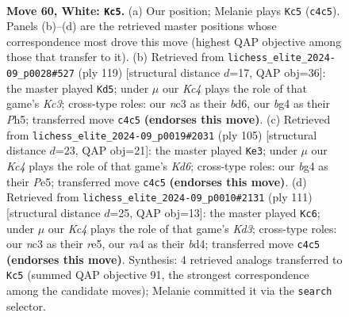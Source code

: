\documentclass[11pt]{article}
\begin{document}
\clearpage

\begin{figure}[p]\centering
\begin{subfigure}{0.46\textwidth}\centering
\resizebox{\linewidth}{!}{%
\newchessgame
\chessboard[
  setfen={8/7p/4k3/4p3/rpK3b1/2n5/6r1/8 w - - 10 60},
  showmover=false,
  pgfstyle=straightmove, color=movearrow, markmove={c4-c5}
]}
\caption{}
\end{subfigure}\hfill
\begin{subfigure}{0.46\textwidth}\centering
\resizebox{\linewidth}{!}{%
\newchessgame
\chessboard[
  setfen={3K4/2P5/2kB1RP1/7p/7P/8/8/1r6 b - - 4 60},
  showmover=false,
  pgfstyle=straightmove, color=movearrow, markmove={c6-d5}
]}
\caption{}
\end{subfigure}
\\[4pt]
\begin{subfigure}{0.46\textwidth}\centering
\resizebox{\linewidth}{!}{%
\newchessgame
\chessboard[
  setfen={8/8/8/4p1P1/4N3/K2k1P2/5R2/6r1 b - - 4 53},
  showmover=false,
  pgfstyle=straightmove, color=movearrow, markmove={d3-e3}
]}
\caption{}
\end{subfigure}\hfill
\begin{subfigure}{0.46\textwidth}\centering
\resizebox{\linewidth}{!}{%
\newchessgame
\chessboard[
  setfen={8/8/3k4/4RP2/3BK3/2P5/6PP/8 b - - 0 56},
  showmover=false,
  pgfstyle=straightmove, color=movearrow, markmove={d6-c6}
]}
\caption{}
\end{subfigure}
\caption{\textbf{Move 60, White: \texttt{Kc5}.} (a) Our position; Melanie plays \texttt{Kc5} (\texttt{c4c5}). Panels (b)--(d) are the retrieved master positions whose correspondence most drove this move (highest QAP objective among those that transfer to it). (b) Retrieved from \texttt{lichess\_elite\_2024-09\_p0028\#527} (ply 119) [structural distance $d$=17, QAP obj=36]: the master played \texttt{Kd5}; under $\mu$ our \emph{Kc4} plays the role of that game's \emph{Kc3}; cross-type roles: our \emph{n}c3 as their \emph{b}d6, our \emph{b}g4 as their \emph{P}h5; transferred move \texttt{c4c5} \textbf{(endorses this move)}. (c) Retrieved from \texttt{lichess\_elite\_2024-09\_p0019\#2031} (ply 105) [structural distance $d$=23, QAP obj=21]: the master played \texttt{Ke3}; under $\mu$ our \emph{Kc4} plays the role of that game's \emph{Kd6}; cross-type roles: our \emph{b}g4 as their \emph{P}e5; transferred move \texttt{c4c5} \textbf{(endorses this move)}. (d) Retrieved from \texttt{lichess\_elite\_2024-09\_p0010\#2131} (ply 111) [structural distance $d$=25, QAP obj=13]: the master played \texttt{Kc6}; under $\mu$ our \emph{Kc4} plays the role of that game's \emph{Kd3}; cross-type roles: our \emph{n}c3 as their \emph{r}e5, our \emph{r}a4 as their \emph{b}d4; transferred move \texttt{c4c5} \textbf{(endorses this move)}. Synthesis: 4 retrieved analogs transferred to \texttt{Kc5} (summed QAP objective 91, the strongest correspondence among the candidate moves); Melanie committed it via the \texttt{search} selector.}
\label{fig:thought-m118}
\end{figure}
\end{document}
